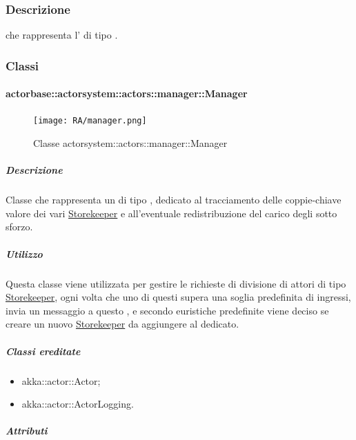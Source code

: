 \documentclass{scalatekids-article}
\begin{document}
\subsubsection{Descrizione}
 che rappresenta l' di tipo .

\subsubsection{Classi}

\paragraph{actorbase::actorsystem::actors::manager::Manager}
\label{sec:actorbase::actorsystem::actors::manager::Manager}

\begin{figure}[H]
  \begin{center}
    \texttt{[image: RA/manager.png]}
    \caption{Classe actorsystem::actors::manager::Manager}
  \end{center}
\end{figure}

\subparagraph{Descrizione}
Classe che rappresenta un  di tipo , dedicato al
tracciamento delle coppie-chiave valore dei vari
\hyperref[sec::actorbase::actorsystem::actors::storekeeper::Storekeeper]{Storekeeper}
e all'eventuale redistribuzione del carico degli  sotto sforzo.

\subparagraph{Utilizzo}
Questa classe viene utilizzata per gestire le richieste di divisione di attori
di tipo
\hyperref[sec:actorbase::actorsystem::actors::storekeeper::Storekeeper]{Storekeeper},
ogni volta che uno di questi  supera una soglia predefinita di
ingressi, invia un messaggio a questo , e secondo euristiche
predefinite viene deciso se creare un nuovo
\hyperref[sec:actorbase::actorsystem::actors::storekeeper::Storekeeper]{Storekeeper}
da aggiungere al  dedicato.

\subparagraph{Classi ereditate}
\begin{itemize}
\item akka::actor::Actor;
\item akka::actor::ActorLogging.
\end{itemize}

\subparagraph{Attributi}
\end{document}
